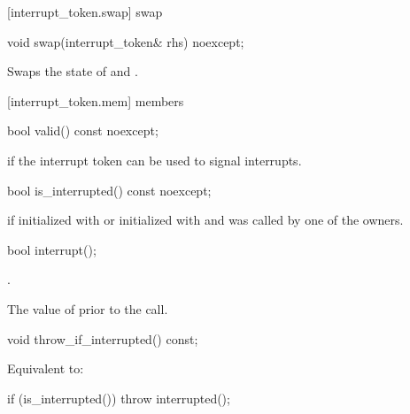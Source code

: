 {%
[interrupt_token.swap]{ swap}

%
\begin{itemdecl}
void swap(interrupt_token& rhs) noexcept;
\end{itemdecl}

\begin{itemdescr}
\pnum
\effects Swaps the state of  and .
\end{itemdescr}


[interrupt_token.mem]{ members}

%
\begin{itemdecl}
bool valid() const noexcept;
\end{itemdecl}
\begin{itemdescr}
  \pnum\returns {} if the interrupt token can be used to signal interrupts.
\end{itemdescr}

%
\begin{itemdecl}
bool is_interrupted() const noexcept;
\end{itemdecl}
\begin{itemdescr}
  \pnum\returns {} if initialized with 
                or initialized with  and  was called
                by one of the owners.
\end{itemdescr}

%
\begin{itemdecl}
bool interrupt();
\end{itemdecl}
\begin{itemdescr}
  \pnum\requires {}

  \pnum\effects {}.

  \pnum\returns The value of  prior to the call.
\end{itemdescr}

%
\begin{itemdecl}
void throw_if_interrupted() const;
\end{itemdecl}
\begin{itemdescr}
  \pnum\effects Equivalent to:
\begin{codeblock}
if (is_interrupted())
  throw interrupted();
\end{codeblock}
\end{itemdescr}


}
